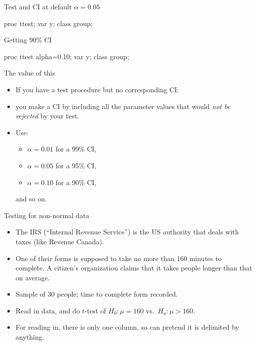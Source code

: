\documentclass[unknownkeysallowed]{beamer}\usepackage[]{graphicx}\usepackage[]{color}
\begin{document}
\begin{frame}[fragile]{Test and CI at default $\alpha=0.05$}
  
  \begin{Sascode}[store=iu]
    proc ttest;
      var y;
      class group;
  \end{Sascode}
  
  
\end{frame}

\begin{frame}[fragile]{Getting 90\% CI}
  
  \begin{Sascode}[store=iva]
    proc ttest alpha=0.10;
      var y;
      class group;
  \end{Sascode}
  
  
  
\end{frame}

\begin{frame}[fragile]{The value of this}

  \begin{itemize}
  \item If you have a test procedure but no corresponding CI:
  \item you make a CI by including all the parameter values that would
    \emph{not be rejected} by your test.
  \item Use:
    \begin{itemize}
    \item $\alpha=0.01$ for a 99\% CI,
    \item     $\alpha=0.05$ for a 95\% CI,
    \item  $\alpha=0.10$ for a 90\% CI, 
    \end{itemize}
    and so on.
  \end{itemize}
  
\end{frame}


\begin{frame}[fragile]{Testing for non-normal data}
  
  \begin{itemize}
  \item The IRS (``Internal Revenue Service'') is the US authority
    that deals with taxes (like Revenue Canada). 
  \item One of their forms is supposed to take no more than 160
    minutes to complete. A citizen's organization claims that it takes
    people longer than that on average.
  \item Sample of 30 people; time to complete form recorded.
  \item Read in data, and do $t$-test of $H_0: \mu=160$ vs.\
    $H_a: \mu>160$.
  \item For reading in, there is only one column, so can pretend it is
    delimited by anything.
  \end{itemize}
  
\end{frame}
\end{document}
